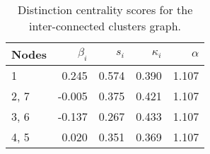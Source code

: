 \begin{table}
\centering
\caption{\label{tab:inter}Distinction centrality scores for the inter-connected clusters graph.}
\centering
\begin{tabular}[t]{lrrrr}
\toprule
Nodes & $\beta_i$ & $s_i$ & $\kappa_i$ & $\alpha$\\
\midrule
1 & 0.245 & 0.574 & 0.390 & 1.107\\
2, 7 & -0.005 & 0.375 & 0.421 & 1.107\\
3, 6 & -0.137 & 0.267 & 0.433 & 1.107\\
4, 5 & 0.020 & 0.351 & 0.369 & 1.107\\
\bottomrule
\end{tabular}
\end{table}
